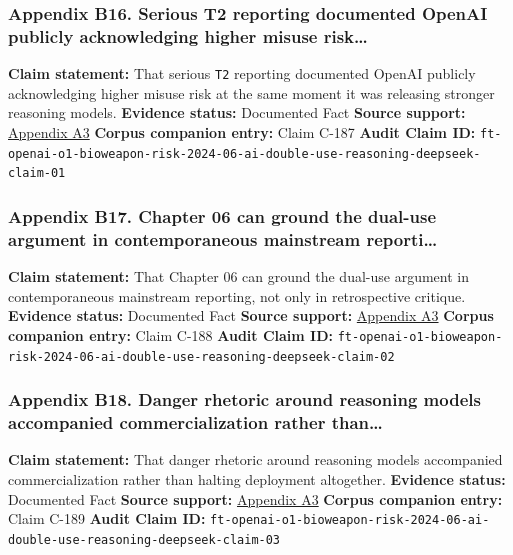 \documentclass[
  american,
  11pt,
  letterpaper,
]{article}
\begin{document}
\subsubsection{Appendix B16. Serious T2 reporting documented OpenAI
publicly acknowledging higher misuse
risk\ldots{}}\label{ch-06-appendix-b16-serious-t2-reporting-documented-openai-publicly-acknowledging-higher-misuse-risk}

\textbf{Claim statement:} That serious \texttt{T2} reporting documented
OpenAI publicly acknowledging higher misuse risk at the same moment it
was releasing stronger reasoning models. \textbf{Evidence status:}
Documented Fact \textbf{Source support:}
\hyperref[ch-06-appendix-a3-openai-acknowledges-new-models-increase-risk-of-misuse-to-create-bioweapons]{Appendix
A3} \textbf{Corpus companion entry:} Claim C-187 \textbf{Audit Claim
ID:}
\texttt{ft-openai-o1-bioweapon-risk-2024-06-ai-double-use-reasoning-deepseek-claim-01}

\subsubsection{Appendix B17. Chapter 06 can ground the dual-use argument
in contemporaneous mainstream
reporti\ldots{}}\label{ch-06-appendix-b17-chapter-06-can-ground-the-dual-use-argument-in-contemporaneous-mainstream-reporti}

\textbf{Claim statement:} That Chapter 06 can ground the dual-use
argument in contemporaneous mainstream reporting, not only in
retrospective critique. \textbf{Evidence status:} Documented Fact
\textbf{Source support:}
\hyperref[ch-06-appendix-a3-openai-acknowledges-new-models-increase-risk-of-misuse-to-create-bioweapons]{Appendix
A3} \textbf{Corpus companion entry:} Claim C-188 \textbf{Audit Claim
ID:}
\texttt{ft-openai-o1-bioweapon-risk-2024-06-ai-double-use-reasoning-deepseek-claim-02}

\subsubsection{Appendix B18. Danger rhetoric around reasoning models
accompanied commercialization rather
than\ldots{}}\label{ch-06-appendix-b18-danger-rhetoric-around-reasoning-models-accompanied-commercialization-rather-than}

\textbf{Claim statement:} That danger rhetoric around reasoning models
accompanied commercialization rather than halting deployment altogether.
\textbf{Evidence status:} Documented Fact \textbf{Source support:}
\hyperref[ch-06-appendix-a3-openai-acknowledges-new-models-increase-risk-of-misuse-to-create-bioweapons]{Appendix
A3} \textbf{Corpus companion entry:} Claim C-189 \textbf{Audit Claim
ID:}
\texttt{ft-openai-o1-bioweapon-risk-2024-06-ai-double-use-reasoning-deepseek-claim-03}
\end{document}
